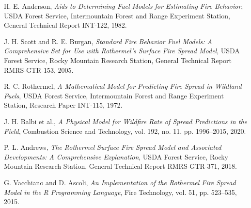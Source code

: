 \documentclass{article}
\begin{document}
	\begin{thebibliography}{9}
		H. E. Anderson, 
		\textit{Aids to Determining Fuel Models for Estimating Fire Behavior}, 
		USDA Forest Service, Intermountain Forest and Range Experiment Station, General Technical Report INT-122, 1982.
		
		J. H. Scott and R. E. Burgan, 
		\textit{Standard Fire Behavior Fuel Models: A Comprehensive Set for Use with Rothermel's Surface Fire Spread Model}, 
		USDA Forest Service, Rocky Mountain Research Station, General Technical Report RMRS-GTR-153, 2005.
		
		R. C. Rothermel, 
		\textit{A Mathematical Model for Predicting Fire Spread in Wildland Fuels}, 
		USDA Forest Service, Intermountain Forest and Range Experiment Station, Research Paper INT-115, 1972.
		
		J. H. Balbi et al., 
		\textit{A Physical Model for Wildfire Rate of Spread Predictions in the Field}, 
		Combustion Science and Technology, vol. 192, no. 11, pp. 1996–2015, 2020.
		
		P. L. Andrews, 
		\textit{The Rothermel Surface Fire Spread Model and Associated Developments: A Comprehensive Explanation}, 
		USDA Forest Service, Rocky Mountain Research Station, General Technical Report RMRS-GTR-371, 2018.
		
		G. Vacchiano and D. Ascoli, 
		\textit{An Implementation of the Rothermel Fire Spread Model in the R Programming Language}, 
		Fire Technology, vol. 51, pp. 523–535, 2015.
		
	\end{thebibliography}
	
\end{document}
